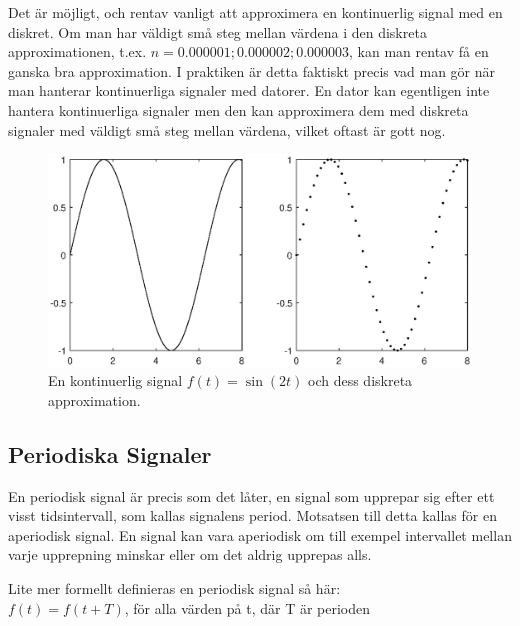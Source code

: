 \documentclass{article}
\begin{document}
Det är möjligt, och rentav vanligt att approximera en kontinuerlig signal med en diskret. Om man har väldigt små steg mellan värdena i den diskreta approximationen, t.ex. $n={0.000001 ; 0.000002 ; 0.000003}$, kan man rentav få en ganska bra approximation. I praktiken är detta faktiskt precis vad man gör när man hanterar kontinuerliga signaler med datorer. En dator kan egentligen inte hantera kontinuerliga signaler men den kan approximera dem med diskreta signaler med väldigt små steg mellan värdena, vilket oftast är gott nog.

\begin{figure}[ht]
\centerline{\includegraphics[scale=0.55]{images/diskretisering.eps}}
\caption{En kontinuerlig signal $f(t) = \sin(2 t)$ och dess diskreta approximation.}
\label{}
\end{figure}

\subsection{Periodiska Signaler}
En periodisk signal är precis som det låter, en signal som upprepar sig efter ett visst tidsintervall, som kallas signalens period. Motsatsen till detta kallas för en aperiodisk signal.
En signal kan vara aperiodisk om till exempel intervallet mellan varje
upprepning minskar eller om det aldrig upprepas alls.

Lite mer formellt definieras en periodisk signal så här:\\
$f(t) = f(t+T)$, för alla värden på t, där T är perioden
\end{document}
